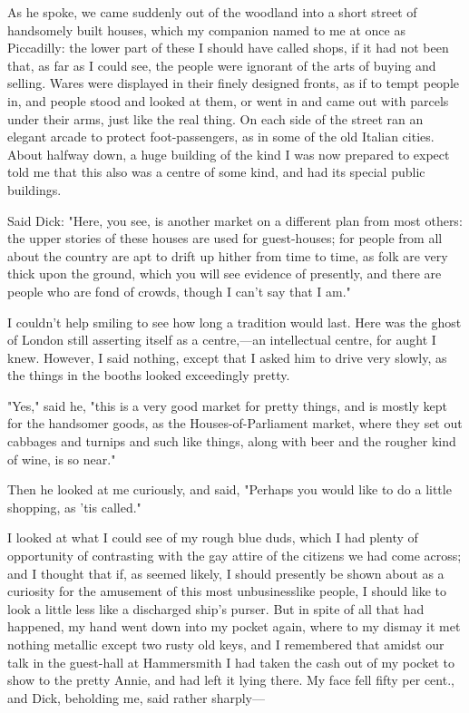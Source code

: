As he spoke, we came suddenly out of the woodland into a short street of
handsomely built houses, which my companion named to me at once as
Piccadilly: the lower part of these I should have called shops, if it
had not been that, as far as I could see, the people were ignorant of
the arts of buying and selling. Wares were displayed in their finely
designed fronts, as if to tempt people in, and people stood and looked
at them, or went in and came out with parcels under their arms, just
like the real thing. On each side of the street ran an elegant arcade to
protect foot-passengers, as in some of the old Italian cities. About
halfway down, a huge building of the kind I was now prepared to expect
told me that this also was a centre of some kind, and had its special
public buildings.

Said Dick: "Here, you see, is another market on a different plan from
most others: the upper stories of these houses are used for
guest-houses; for people from all about the country are apt to drift up
hither from time to time, as folk are very thick upon the ground, which
you will see evidence of presently, and there are people who are fond of
crowds, though I can't say that I am."

I couldn't help smiling to see how long a tradition would last. Here was
the ghost of London still asserting itself as a centre,---an
intellectual centre, for aught I knew. However, I said nothing, except
that I asked him to drive very slowly, as the things in the booths
looked exceedingly pretty.

"Yes," said he, "this is a very good market for pretty things, and is
mostly kept for the handsomer goods, as the Houses-of-Parliament market,
where they set out cabbages and turnips and such like things, along with
beer and the rougher kind of wine, is so near."

Then he looked at me curiously, and said, "Perhaps you would like to do
a little shopping, as 'tis called."

I looked at what I could see of my rough blue duds, which I had plenty
of opportunity of contrasting with the gay attire of the citizens we had
come across; and I thought that if, as seemed likely, I should presently
be shown about as a curiosity for the amusement of this most
unbusinesslike people, I should like to look a little less like a
discharged ship's purser. But in spite of all that had happened, my hand
went down into my pocket again, where to my dismay it met nothing
metallic except two rusty old keys, and I remembered that amidst our
talk in the guest-hall at Hammersmith I had taken the cash out of my
pocket to show to the pretty Annie, and had left it lying there. My face
fell fifty per cent., and Dick, beholding me, said rather sharply---

